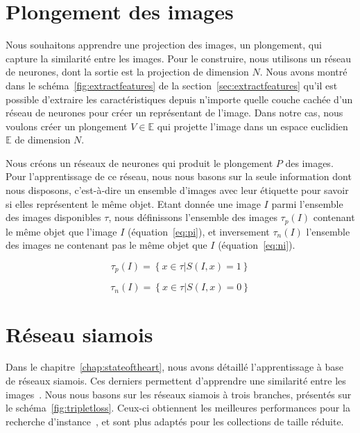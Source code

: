 \section{Plongement des images}

Nous souhaitons apprendre une projection des images, un plongement, qui capture la similarité entre les images. 
Pour le construire, nous utilisons un réseau de neurones, dont la sortie est la projection de dimension $N$. 
Nous avons montré dans le schéma~\ref{fig:extractfeatures} de la section~\ref{sec:extractfeatures} qu'il est possible d'extraire les caractéristiques depuis n'importe quelle couche cachée d'un réseau de neurones pour créer un représentant de l'image. 
Dans notre cas, nous voulons créer un plongement $V \in \mathbb{E}$ qui projette l'image dans un espace euclidien $\mathbb{E}$ de dimension $N$.

Nous créons un réseaux de neurones qui produit le plongement $P$ des images.
Pour l'apprentissage de ce réseau, nous nous basons sur la seule information dont nous disposons, c'est-à-dire un ensemble d'images avec leur étiquette pour savoir si elles représentent le même objet. 
Etant donnée une image $I$ parmi l'ensemble des images disponibles $\tau$, nous définissons l'ensemble des images $\tau_p(I)$ contenant le même objet que l'image $I$ (équation~\ref{eq:pi}), et inversement $\tau_n(I)$ l'ensemble des images ne contenant pas le même objet que $I$ (équation~\ref{eq:ni}).

\begin{equation}
\tau_p(I) = \left\{ x \in \tau | S(I, x) = 1 \right\}
\label{eq:pi}
\end{equation}

\begin{equation}
\tau_n(I) = \left\{ x \in \tau | S(I, x) = 0 \right\}
\label{eq:ni}
\end{equation}



\section{Réseau siamois}

Dans le chapitre~\ref{chap:stateoftheart}, nous avons détaillé l'apprentissage à base de réseaux siamois. 
Ces derniers permettent d'apprendre une similarité entre les images~\cite{schroff2015facenet}. 
Nous nous basons sur les réseaux siamois à trois branches, présentés sur le schéma~\ref{fig:tripletloss}.
Ceux-ci obtiennent les meilleures performances pour la recherche d'instance~\cite{gordo2016deep}, et sont plus adaptés pour les collections de taille réduite.


